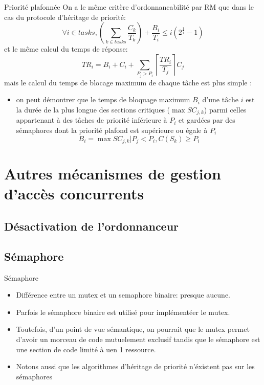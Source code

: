 \begin{frame}{Priorité plafonnée} 
  On a  le même critère d'ordonnancabilité  par RM que dans  le cas du
  protocole d'héritage de priorité:
  $$\forall i \in tasks, \left( \sum_{k \in tasks} \frac{C_k}{T_k} \right) + \frac{B_i}{T_i} ≤ i \left(2^{\frac{1}{i}}-1\right)$$
  et le même calcul du temps de réponse:
  $$TR_i = B_i + C_i + \sum_{P_j > P_i} \left\lceil\frac{TR_i}{T_j}\right\rceil C_j$$
  mais le calcul du temps de  blocage maximum de chaque tâche est plus
  simple :
  \begin{itemize}
  \item on peut démontrer que le temps de bloquage maximum $B_i$ d'une
    tâche $i$  est la durée de  la plus longue  des sections critiques
    ($\max  SC_{j,k}$)  parmi  celles  appartenant  à  des  tâches  de
    priorité inférieure à $P_i$ et  gardées par des sémaphores dont la
    priorité plafond est supérieure ou égale à $P_i$
    $$B_i = \max SC_{j,k} | P_j < P_i, C(S_k) ≥ P_i$$ 
  \end{itemize}
\end{frame}

\section{Autres mécanismes de gestion d'accès concurrents}

\subsection{Désactivation de l'ordonnanceur}


\subsection{Sémaphore}

\begin{frame}{Sémaphore}
  \begin{itemize} 
  \item  Différence entre un  mutex et  un semaphore  binaire: presque
    aucune.
  \item Parfois le sémaphore  binaire est utilisé pour implémentéer le
    mutex.
  \item Toutefois,  d'un point de  vue sémantique, on pourrait  que le
    mutex  permet  d'avoir un  morceau  de  code mutuelement  exclusif
    tandis que  le sémaphore est  une section de  code limité à  uen 1
    ressource.
  \item  Notons  aussi  que  les  algorithmes  d'héritage  de  priorité
    n'éxistent pas sur les sémaphores
  \end{itemize} 
\end{frame} 

